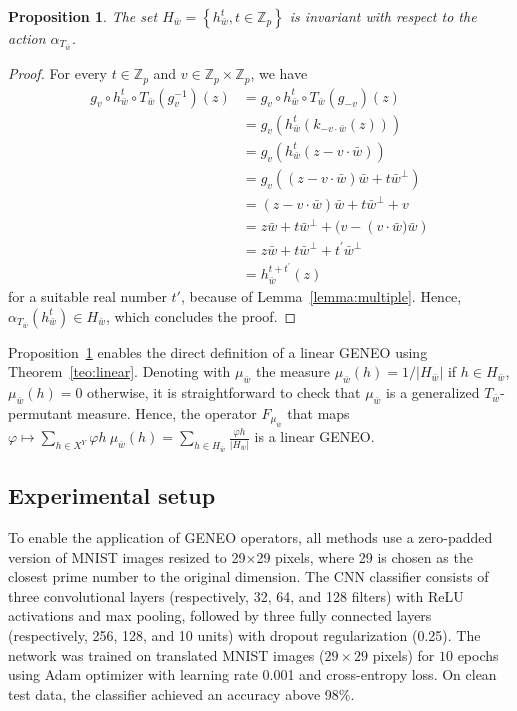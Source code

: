\documentclass[11pt]{article}
\newcommand{\Z}{\mathbb{Z}}
\newcommand{\p}{\varphi}
\newtheorem{proposition}[theorem]{Proposition}
\begin{document}
\begin{proposition}
\label{prop:permutant}
    The set $H_{\bar w} = \left\{ h_{\bar w}^t, t \in \Z_p\right\}$ is invariant with respect to the action $\alpha_{T_{\bar{w}}}$.
\end{proposition}
\begin{proof}
    For every $t\in\Z_p$ and $v\in \Z_p\times \Z_p$, we have
    \begin{align*}
        g_v \circ h_{\bar w}^t \circ T_{\bar w}(g_v^{-1})(z) &= g_v \circ h_{\bar w}^t \circ T_{\bar w}(g_{-v})(z) \\
        &= g_v\left(h_{\bar w}^t\left(k_{-v\cdot \bar w}(z)\right)\right) \\
        &= g_v\left(h_{\bar w}^t(z - v \cdot \bar w) \right) \\
        &= g_v \left( (z-v\cdot \bar w)\bar w + t \bar{w}^\perp \right) \\
        &= (z - v\cdot \bar w)\bar w + t \bar{w}^\perp + v \\
        &= z\bar w +t\bar{w}^\perp + (v - \left(v\cdot \bar w)\bar w\right) \\
        &= z\bar w + t\bar{w}^\perp + t^\prime \bar{w}^\perp \\
        &= h_{\bar w}^{t + t^\prime}(z)
    \end{align*}
  for a suitable real number $t'$, because of Lemma~\ref{lemma:multiple}.
Hence, $\alpha_{T_{\bar{w}}}(h_{\bar{w}}^{t}) \in H_{\bar w}$, which concludes the proof.
\end{proof}

Proposition~\ref{prop:permutant} enables the direct definition of a linear GENEO using Theorem~\ref{teo:linear}. Denoting with $\mu_{\bar w}$ the measure $\mu_{\bar w}(h) = 1/|H_{\bar w}|$ if $h \in H_{\bar w}$, $\mu_{\bar w}(h) = 0$ otherwise, it is straightforward to check that $\mu_{\bar w}$ is a generalized $T_{\bar{w}}$-permutant measure. Hence, the operator $F_{\mu_{\bar w}}$ that maps 
$\varphi \mapsto {\sum_{h \in X^Y} \p h \ \mu_{\bar w}(h)}=\sum_{h \in H_{\bar w}} \frac{\varphi h}{|H_{\bar w}|}$ is a linear GENEO.

\subsection{Experimental setup}
To enable the application of GENEO operators, all methods use a zero-padded version of MNIST images resized to 29×29 pixels, where 29 is chosen as the closest prime number to the original dimension. The CNN classifier consists of three convolutional layers (respectively, 32, 64, and 128 filters) with ReLU activations and max pooling, followed by three fully connected layers (respectively, 256, 128, and 10 units) with dropout regularization (0.25). The network was trained on translated MNIST images ($29\times29$ pixels) for $10$ epochs using Adam optimizer with learning rate 0.001 and cross-entropy loss. On clean test data, the classifier achieved an accuracy above 98\%.
\end{document}

